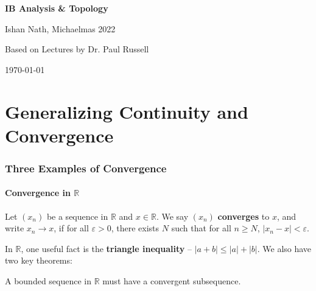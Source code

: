 \documentclass[12pt]{article}
\begin{document}
\hypersetup{pageanchor=false}
\begin{titlepage}
	\begin{center}
		\vspace*{1em}
		\Huge
		\textbf{IB Analysis \& Topology}

		\vspace{1em}
		\large
		Ishan Nath, Michaelmas 2022

		\vspace{1.5em}

		\Large

		Based on Lectures by Dr. Paul Russell

		\vspace{1em}

		\large
		\today
	\end{center}
	
\end{titlepage}
\hypersetup{pageanchor=true}

\tableofcontents

\newpage

\part{Generalizing Continuity and Convergence}%
\label{prt:generalizing_continuity_and_convergence}

\section{Three Examples of Convergence}%
\label{sec:three_examples_of_convergence}

\subsection{Convergence in \texorpdfstring{$\mathbb{R}$}{R}}%
\label{sub:convergence_in_r_}

Let $(x_n)$ be a sequence in $\mathbb{R}$ and $x \in \mathbb{R}$. We say $(x_n)$ \textbf{converges} to $x$, and write $x_n \to x$, if for all $\varepsilon > 0$, there exists $N$ such that for all $n \geq N$, $|x_n - x| < \varepsilon$.

In $\mathbb{R}$, one useful fact is the \textbf{triangle inequality} -- $|a+b| \leq |a| + |b|$. We also have two key theorems:

\begin{theorem}
\item
	A bounded sequence in $\mathbb{R}$ must have a convergent subsequence.
\end{theorem}
\end{document}
